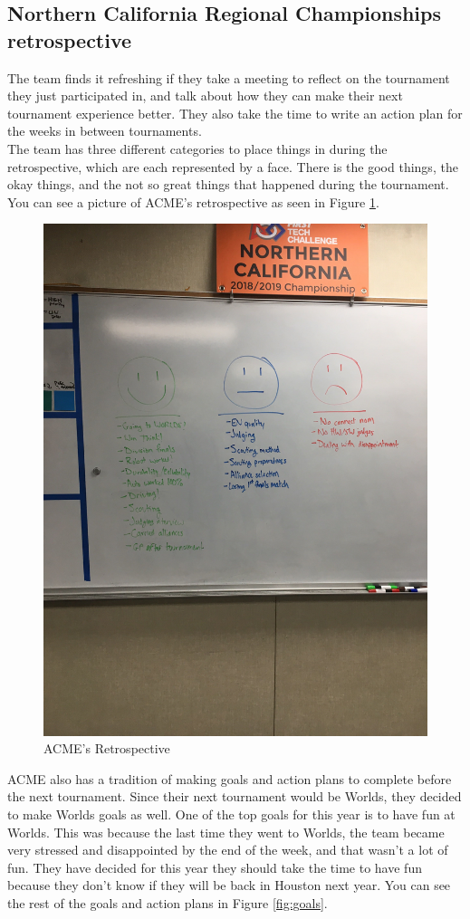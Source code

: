 \documentclass{article}
\begin{document}
\subsection{Northern California Regional Championships retrospective}
The team finds it refreshing if they take a meeting to reflect on the tournament they just participated in, and talk about how they can make their next tournament experience better. They also take the time to write an action plan for the weeks in between tournaments. \\

The team has three different categories to place things in during the retrospective, which are each represented by a face. There is the good things, the okay things, and the not so great things that happened during the tournament. You can see a picture of ACME's retrospective as seen in Figure \ref{fig:retro}. \\

\begin{figure}
    \centering
    \includegraphics[width= 0.5 \textwidth]{27_03-04/images/retrospective.JPG}
    \caption{ACME's Retrospective}
    \label{fig:retro}
\end{figure}

ACME also has a tradition of making goals and action plans to complete before the next tournament. Since their next tournament would be Worlds, they decided to make Worlds goals as well. One of the top goals for this year is to have fun at Worlds. This was because the last time they went to Worlds, the team became very stressed and disappointed by the end of the week, and that wasn't a lot of fun. They have decided for this year they should take the time to have fun because they don't know if they will be back in Houston next year. You can see the rest of the goals and action plans in Figure \ref{fig:goals}. \\
\end{document}
